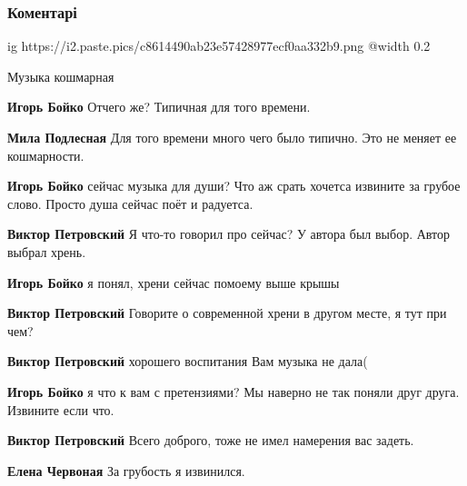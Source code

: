  
 
 
 
 
\subsubsection{Коментарі}
\label{sec:02_04_2021.fb.fb_group.story_kiev_ua.1.kreschatik.cmt}

\begin{itemize} %

\ifcmt
  ig https://i2.paste.pics/c8614490ab23e57428977ecf0aa332b9.png
  @width 0.2
\fi

Музыка кошмарная

\begin{itemize} %
\textbf{Игорь Бойко} Отчего же? Типичная для того времени.

\textbf{Мила Подлесная} Для того времени много чего было типично. Это не меняет ее кошмарности.

\textbf{Игорь Бойко} сейчас музыка для души? Что аж срать хочетса извините за грубое слово. Просто душа сейчас поёт и радуетса.

\begin{itemize} %
\textbf{Виктор Петровский} Я что-то говорил про сейчас? У автора был выбор. Автор выбрал хрень.

\textbf{Игорь Бойко} я понял, хрени сейчас помоему выше крышы

\textbf{Виктор Петровский} Говорите о современной хрени в другом месте, я тут при чем?

\textbf{Виктор Петровский} хорошего воспитания Вам музыка не дала(

\textbf{Игорь Бойко} я что к вам с претензиями? Мы наверно не так поняли друг друга. Извините если что.

\textbf{Виктор Петровский} Всего доброго, тоже не имел намерения вас задеть.

\textbf{Елена Червоная} За грубость я извинился.


\end{itemize}
\end{itemize}
\end{itemize}
